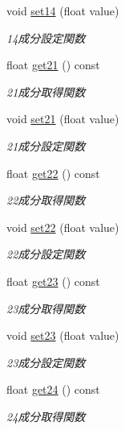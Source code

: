 \begin{DoxyCompactItemize}
void \mbox{\hyperlink{class_matrix_a289a3908210e92d94534d30dc0b12476}{set14}} (float value)
\begin{DoxyCompactList}\small\item\em 14成分設定関数 \end{DoxyCompactList}\item 
float \mbox{\hyperlink{class_matrix_a15690e89cfa1b92622e0351241866155}{get21}} () const
\begin{DoxyCompactList}\small\item\em 21成分取得関数 \end{DoxyCompactList}\item 
void \mbox{\hyperlink{class_matrix_a05f282ddbc60accffe4f1577a93c4d01}{set21}} (float value)
\begin{DoxyCompactList}\small\item\em 21成分設定関数 \end{DoxyCompactList}\item 
float \mbox{\hyperlink{class_matrix_a428eda049627bc475ab5eedecb24e5b8}{get22}} () const
\begin{DoxyCompactList}\small\item\em 22成分取得関数 \end{DoxyCompactList}\item 
void \mbox{\hyperlink{class_matrix_a56eee3be58eefa236f75cbf7872e4dbc}{set22}} (float value)
\begin{DoxyCompactList}\small\item\em 22成分設定関数 \end{DoxyCompactList}\item 
float \mbox{\hyperlink{class_matrix_adda10197b722e22d6779726975be976c}{get23}} () const
\begin{DoxyCompactList}\small\item\em 23成分取得関数 \end{DoxyCompactList}\item 
void \mbox{\hyperlink{class_matrix_a765ef911f6d3345b05f6bda8f2330595}{set23}} (float value)
\begin{DoxyCompactList}\small\item\em 23成分設定関数 \end{DoxyCompactList}\item 
float \mbox{\hyperlink{class_matrix_a4655f6764dfb0f9afeb6a9f6055adb93}{get24}} () const
\begin{DoxyCompactList}\small\item\em 24成分取得関数 \end{DoxyCompactList}\item 

\end{DoxyCompactItemize}
